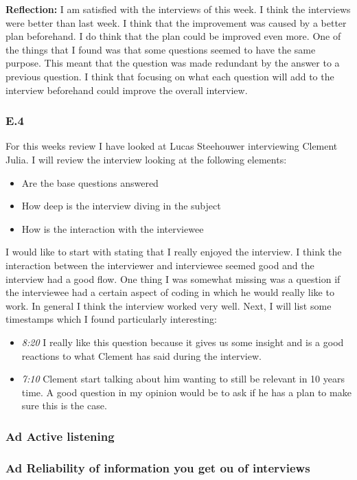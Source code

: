 \documentclass[]{article}
\begin{document}
\noindent\textbf{Reflection: }
I am satisfied with the interviews of this week. I think the interviews were 
better than last week. I think that the improvement was caused by a better 
plan beforehand. I do think that the plan could be improved even more. 
One of the things that I found was that some questions seemed to have the same 
purpose. This meant that the question was made redundant by the answer to a 
previous question. I think that focusing on what each question will add 
to the interview beforehand could improve the overall interview.

\subsubsection*{E.4}
For this weeks review I have looked at Lucas Steehouwer interviewing Clement Julia.
I will review the interview looking at the following elements:
\begin{itemize}
    \item Are the base questions answered
    \item How deep is the interview diving in the subject
    \item How is the interaction with the interviewee
\end{itemize}

\noindent I would like to start with stating that I really enjoyed the interview.
I think the interaction between the interviewer and interviewee seemed good and 
the interview had a good flow. One thing I was somewhat missing was a question 
if the interviewee had a certain aspect of coding in which he would really like 
to work. In general I think the interview worked very well. Next, I will list 
some timestamps which I found particularly interesting:

\begin{itemize}
    \item[] \textit{8:20} I really like this question because it gives us some 
    insight and is a good reactions to what Clement has said during the interview. 
    \item[] \textit{7:10} Clement start talking about him wanting to still be 
    relevant in 10 years time. A good question in my opinion would be to ask 
    if he has a plan to make sure this is the case. 
\end{itemize}




\subsubsection*{Ad Active listening}

\subsubsection*{Ad Reliability of information you get ou of interviews}


\printbibliography
\end{document}
